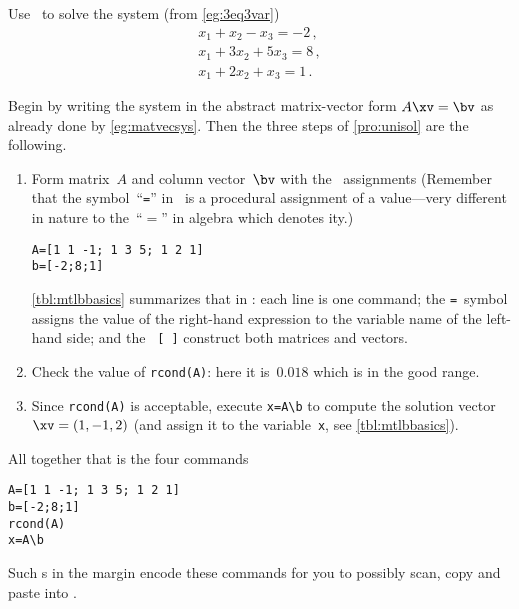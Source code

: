 \begin{example} \label{eg:3eq3varc}
Use \script\ to solve the system (from \cref{eg:3eq3var})
\begin{equation*}
\begin{array}{l}
x_1+x_2-x_3=-2\,,\\
x_1+3x_2+5x_3=8\,,\\
x_1+2x_2+x_3=1\,.
\end{array}
\end{equation*}
\begin{solution} 
Begin by writing the system in the abstract matrix-vector form \(A\xv=\bv\) as already done by \cref{eg:matvecsys}.
Then the three steps of \cref{pro:unisol} are the following.
\begin{enumerate}
\item Form matrix~\(A\) and {column vector}~\(\bv\) with the \script\ assignments
(Remember that the symbol~``\texttt{=}'' in \script\ is a procedural 
assignment of a value---very different in nature to the~``\(=\)'' in 
algebra which denotes ity.)
\begin{verbatim}
A=[1 1 -1; 1 3 5; 1 2 1]
b=[-2;8;1]
\end{verbatim}
\cref{tbl:mtlbbasics} summarizes that in \script: each line is one command; the \verb|=|~symbol assigns the value of the right-hand expression to the variable name of the left-hand side; and the ~\verb|[ ]| construct both matrices and vectors.
\item Check the value of \verb|rcond(A)|: here it is~\(0.018\) which is in the good range.
\item Since \verb|rcond(A)| is acceptable,  execute \verb|x=A\b| to compute the solution vector~\(\xv=(1,-1,2)\) (and assign it to the variable~\verb|x|, see \cref{tbl:mtlbbasics}). 
\end{enumerate}
All together that is the four commands
\begin{verbatim}
A=[1 1 -1; 1 3 5; 1 2 1]
b=[-2;8;1]
rcond(A)
x=A\b
\end{verbatim}
\setbox\ajrqrbox\hbox{}%
\marginajrbox%
\ifinQRcodes
Such s in the margin encode these commands for you to possibly scan, copy and paste into \script.
\fi
\end{solution}
\end{example}


